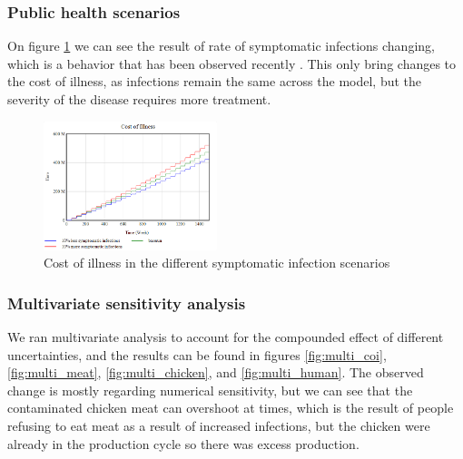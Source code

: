 \subsubsection{Public health scenarios}

On figure \ref{fig:symptom_COI} we can see the result of rate of symptomatic infections changing, which is a behavior that has been observed recently \parencite{medema_assessment_1996}. This only bring changes to the cost of illness, as infections remain the same across the model, but the severity of the disease requires more treatment.

\begin{figure}[h!]
    \centering
    \includegraphics[width=0.45\textwidth]{images/sensitivity/Symptomatic COI.png} 
    \caption{Cost of illness in the different symptomatic infection scenarios}
    \label{fig:symptom_COI}
\end{figure}

\subsubsection{Multivariate sensitivity analysis}

We ran multivariate analysis to account for the compounded effect of different uncertainties, and the results can be found in figures \ref{fig:multi_coi}, \ref{fig:multi_meat}, \ref{fig:multi_chicken}, and \ref{fig:multi_human}. The observed change is mostly regarding numerical sensitivity, but we can see that the contaminated chicken meat can overshoot at times, which is the result of people refusing to eat meat as a result of increased infections, but the chicken were already in the production cycle so there was excess production.


